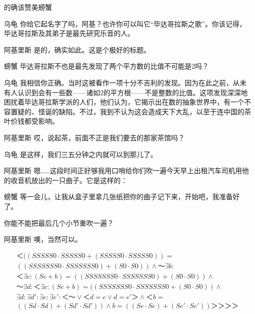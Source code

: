 \begin{dialog}{的确该赞美螃蟹}
\begin{dialogue}
\item[乌龟]你给它起名字了吗，阿基？也许你可以叫它“毕达哥拉斯之歌”。你该记得，毕达哥拉斯及其弟子是最先研究乐音的人。

\item[阿基里斯]是的，确实如此。这是个极好的标题。

\item[螃蟹]毕达哥拉斯不也是最先发现了两个平方数的比值不可能是$2$吗？

\item[乌龟]我相信你正确。当时这被看作一项十分不吉利的发现。因为在此之前，从未有人认识到会有一些数——诸如$2$的平方根——不是整数的比值。这项发现深深地困扰着毕达哥拉斯学派的人们，他们认为，它揭示出在数的抽象世界中，有一个不容置疑的、怪诞的缺陷。不过，我到不认为这会造成天下大乱，以至于连中国的茶叶价钱都受影响。

\item[阿基里斯]哎，说起茶，前面不正是我们要去的那家茶馆吗？

\item[乌龟]是这样，我们三五分钟之内就可以到那儿了。

\item[阿基里斯]嗯……这段时间正好够我用口哨给你们吹一遍今天早上出租汽车司机用他的收音机放出的一只曲子。它是这样的：

\item[螃蟹]等一会儿，让我从盒子里拿几张纸把你的曲子记下来，开始吧，我准备好了。


你能不能把最后几个小节重吹一遍？

\item[阿基里斯]噢，当然可以。

\begin{multline*}
＜((SSSSS0\cdot SSSSS0+(SSSSS0\cdot SSSSS0))=\\
((SSSSSSS0\cdot SSSSSSS0)+(S0\cdot S0))∧～\exists b:\\
＜\exists c:(Sc+b)=((SSSSSSS0\cdot SSSSSSS0)+(S0\cdot S0))∧\\
～\exists d:＜\exists c:(Sc+b)=((SSSSSSS0\cdot SSSSSSS0+(S0\cdot S0))∧\\
\exists d:\exists d':\exists e:\exists e':＜～∨＜d=e∨d=e'＞∧＜b=\\
((Sd\cdot Sd)+(Sd'\cdot Sd'))∧b=((Se\cdot Se)+(Se'\cdot Se'))＞＞＞＞
\end{multline*}


\end{dialogue}
\end{dialog}
